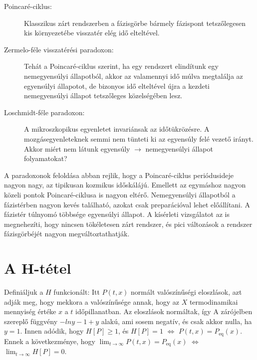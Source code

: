 \begin{description}
    \begin{description}
     \item[Poincaré-ciklus:] Klasszikus zárt rendszerben a fázisgörbe bármely fázispont tetszőlegesen kis környezetébe visszatér elég idő elteltével. 
     \item[Zermelo-féle visszatérési paradoxon:] Tehát a Poincaré-ciklus szerint, ha egy rendszert elindítunk egy nemegyensúlyi állapotból, akkor az valamennyi idő múlva megtalálja az egyensúlyi állapotot, de bizonyos idő elteltével újra a kezdeti nemegyensúlyi állapot tetszőleges közelségében lesz. 
     \item[Loschmidt-féle paradoxon:] A mikroszkopikus egyenletet invariánsak az időtükrözésre. A mozgásegyenleteknek semmi nem tünteti ki az egyensúly felé vezető irányt. Akkor miért nem látunk egyensúly $\rightarrow$ nemegyensúlyi állapot folyamatokat?
    \end{description}
    
    A paradoxonok feloldása abban rejlik, hogy a Poincaré-ciklus periódusideje nagyon nagy, az tipikusan kozmikus időskálájú. Emellett az egymáshoz nagyon közeli pontok Poincaré-ciklusa is nagyon eltérő. Nemegyensúlyi állapotból a fázistérben nagyon kevés található, azokat csak preparációval lehet előállítani. A fázistér túlnyomó többsége egyensúlyi állapot. A kísérleti vizsgálatot az is megnehezíti, hogy nincsen tökéletesen zárt rendszer, és pici változások a rendszer fázisgörbéjét nagyon megváltoztathatják. 
  \end{description}
  
 \section{A H-tétel}
  
  Definiáljuk a $H$ funkcionált:
  Itt $P(t,x)$ normált valószínűségi eloszlások, azt adják meg, hogy mekkora a valószínűsége annak, hogy az $X$ termodinamikai mennyiség értéke $x$ a $t$ időpillanatban. Az eloszlások normáltak, így 
  A zárójelben szereplő függvény $-ln y-1+y$ alakú, ami sosem negatív, és csak akkor nulla, ha $y=1$. Innen adódik, hogy $H[P]\ge 1$, és $H[P]=1$ $\Leftrightarrow$ $P(t,x)=P_\text{eq}(x)$. Ennek a következménye, hogy  $\lim_{t\to\infty}P(t,x)=P_\text{eq}(x)$ $\Leftrightarrow$ $\lim_{t\to\infty}H[P]=0$. 
  
